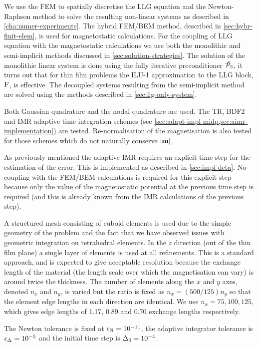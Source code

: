 We use the FEM to spatially discretise the LLG equation and the Newton-Raphson method to solve the resulting non-linear systems as described in \cref{cha:numer-experiments}.
The hybrid FEM/BEM method, described in \cref{sec:hybr-finit-elem}, is used for magnetostatic calculations.
For the coupling of LLG equation with the magnetostatic calculations we use both the monolithic and semi-implicit methods discussed in \cref{sec:solution-strategies}.
The solution of the monolithic linear system is done using the fully iterative preconditioner $\hat{\mathcal{P}_3}$, it turns out that for thin film problems the ILU-1 approximation to the LLG block, $\mathrm{F}$, is effective.
The decoupled systems resulting from the semi-implicit method are solved using the methods described in \cref{sec:llg-only-system}.

Both Gaussian quadrature and the nodal quadrature are used.
The TR, BDF2 and IMR adaptive time integration schemes (see \cref{sec:adapt-impl-midp,sec:aimr-implementation}) are tested.
Re-normalisation of the magnetisation is also tested for those schemes which do not naturally conserve $\left|{\boldsymbol{\mathrm{m}}} \right|$.

As previously mentioned the adaptive IMR requires an explicit time step for the estimation of the error.
This is implemented as described in \cref{sec:impl-deta}.
No coupling with the FEM/BEM calculations is required for this explicit step because only the value of the magnetostatic potential at the previous time step is required (and this is already known from the IMR calculations of the previous step).

A structured mesh consisting of cuboid elements is used due to the simple geometry of the problem and the fact that we have observed issues with geometric integration on tetrahedral elements.
In the $z$ direction (out of the thin film plane) a single layer of elements is used at all refinements.
This is a standard approach, and is expected to give acceptable resolution because the exchange length of the material (the length scale over which the magnetisation can vary) is around twice the thickness.
The number of elements along the $x$ and $y$ axes, denoted $n_x$ and $n_y$, is varied but the ratio is fixed as $n_x = (500/125) n_y$ so that the element edge lengths in each direction are identical.
We use $n_x=75,100,125$, which gives edge lengths of 1.17, 0.89 and 0.70 exchange lengths respectively.

The Newton tolerance is fixed at $\epsilon_{\mathrm{N}} = 10^{-11}$, the adaptive integrator tolerance is $\epsilon_{\Delta_{}} = 10^{-5}$ and the initial time step is $\Delta_{0} = 10^{-4}$.


